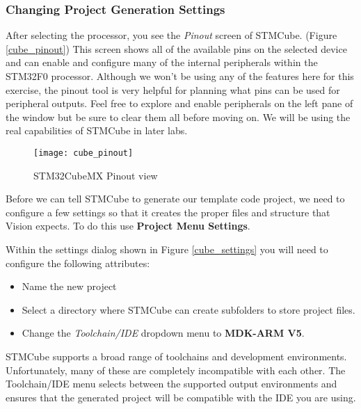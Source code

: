 \documentclass[11pt,fleqn]{book} %
\begin{document}
\subsubsection*{Changing Project Generation Settings}

After selecting the processor, you see the \textit{Pinout} screen of STMCube. (Figure \vref{cube_pinout}) This screen shows all of the available pins on the selected device and can enable and configure many of the internal peripherals within the STM32F0 processor. Although we won't be using any of the features here for this exercise, the pinout tool is very helpful for planning what pins can be used for peripheral outputs. Feel free to explore and enable peripherals on the left pane of the window but be sure to clear them all before moving on. We will be using the real capabilities of STMCube in later labs.

\begin{figure}[h!]
	\centering\texttt{[image: cube\_pinout]}
	\caption{STM32CubeMX Pinout view}
	\label{cube_pinout}
\end{figure}

Before we can tell STMCube to generate our template code project, we need to configure a few settings so that it creates the proper files and structure that {\textmu}Vision expects. To do this use \textbf{Project Menu \textrightarrow Settings}. 

Within the settings dialog shown in Figure \vref{cube_settings} you will need to configure the following attributes:
\begin{itemize}
	\item Name the new project
	\item Select a directory where STMCube can create subfolders to store project files.
	\item Change the \textit{Toolchain/IDE} dropdown menu to \textbf{MDK-ARM V5}.
\end{itemize}

STMCube supports a broad range of toolchains and development environments. Unfortunately, many of these are completely incompatible with each other. The Toolchain/IDE menu selects between the supported output environments and ensures that the generated project will be compatible with the IDE you are using. 
\end{document}
